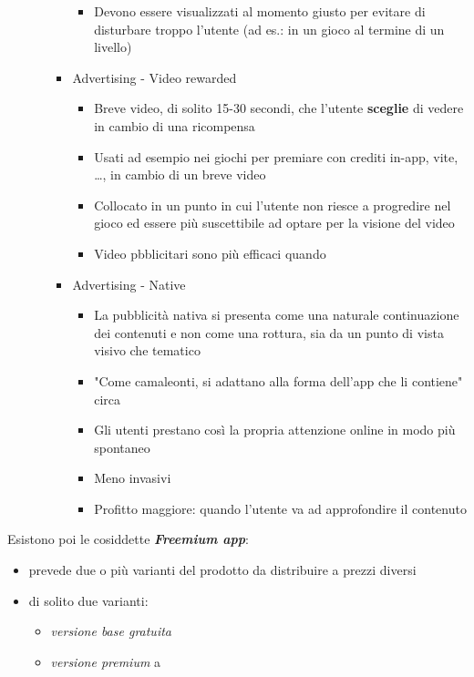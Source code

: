 \begin{itemize}
\begin{itemize}
\begin{itemize}
\begin{itemize}
                \item Devono essere visualizzati al momento giusto per evitare di disturbare troppo l'utente (ad es.: in un gioco al termine di un livello)
            \end{itemize}
            \item Advertising - Video rewarded
            \begin{itemize}
                \item Breve video, di solito 15-30 secondi, che l'utente \textbf{sceglie} di vedere in cambio di una ricompensa
                \item Usati ad esempio nei giochi per premiare con crediti in-app, vite, \dots, in cambio di un breve video
                \item Collocato in un punto in cui l'utente non riesce a progredire nel gioco ed essere più suscettibile ad optare per la visione del video
                \item Video pbblicitari sono più efficaci quando
            \end{itemize}
            \item Advertising - Native
            \begin{itemize}
                \item La pubblicità nativa si presenta come una naturale continuazione dei contenuti e non come una rottura, sia da un punto di vista visivo che tematico
                \item "Come camaleonti, si adattano alla forma dell'app che li contiene" circa
                \item Gli utenti prestano così la propria attenzione online in modo più spontaneo
                \item Meno invasivi
                \item Profitto maggiore: quando l'utente va ad approfondire il contenuto
            \end{itemize}
            
        \end{itemize}
    \end{itemize}
\end{itemize}
\par Esistono poi le cosiddette \textbf{\textit{Freemium app}}:
\begin{itemize}
    \item prevede due o più varianti del prodotto da distribuire a prezzi diversi
    \item di solito due varianti:
    \begin{itemize}
        \item \textit{versione base gratuita}
        \item \textit{versione premium} a 
    \end{itemize}
\end{itemize}
